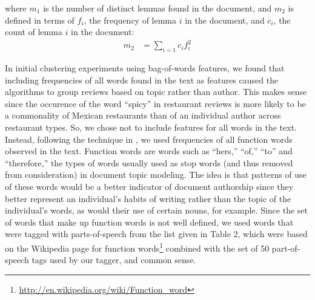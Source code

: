 \documentclass[12pt]{article}
\begin{document}
where $m_1$ is the number of distinct lemmas found in the document, and $m_2$ is defined in terms of $f_i$, the frequency of lemma $i$ in the document, and $c_i$, the count of lemma $i$ in the document:
\begin{align}
m_2 &= \sum_{i=1}c_if_i^2
\end{align}

In initial clustering experiments using bag-of-words features, we found that including frequencies of all words found in the text as features caused the algorithms to group reviews based on topic rather than author. This makes sense since the occurence of the word ``spicy'' in restaurant reviews is more likely to be a commonality of Mexican restaurants than of an individual author across restaurant types. So, we chose not to include features for all words in the text. Instead, following the technique in \cite{Narayanan2012}, we used frequencies of all function words observed in the text. Function words are words such as ``hers,'' ``of,'' ``to'' and ``therefore,'' the types of words usually used as stop words (and thus removed from consideration) in document topic modeling. The idea is that patterns of use of these words would be a better indicator of document authorship since they better represent an individual's habits of writing rather than the topic of the individual's words, as would their use of certain nouns, for example. Since the set of words that make up function words is not well defined, we used words that were tagged with parts-of-speech from the list given in Table 2, which were based on the Wikipedia page for function words\footnote{\protect\url{http://en.wikipedia.org/wiki/Function_word}} combined with the set of 50 part-of-speech tags used by our tagger, and common sense.
\end{document}
